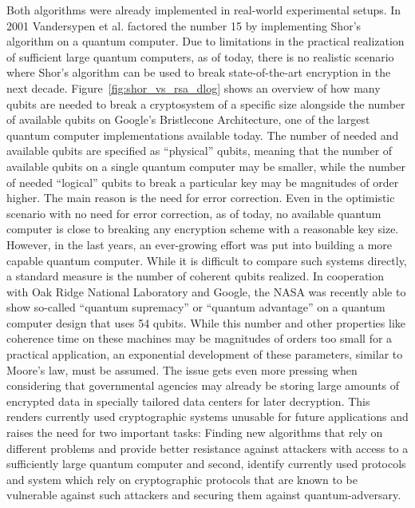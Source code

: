 Both algorithms were already implemented in real-world experimental setups. In 2001 Vandersypen et al. factored the number 15 by implementing Shor’s algorithm on a quantum computer\cite{vandersypen2001experimental}. Due to limitations in the practical realization of sufficient large quantum computers, as of today, there is no realistic scenario where Shor's algorithm can be used to break state-of-the-art encryption in the next decade. Figure~\ref{fig:shor_vs_rsa_dlog} shows an overview of how many qubits are needed to break a cryptosystem of a specific size alongside the number of available qubits on Google's Bristlecone Architecture, one of the largest quantum computer implementations available today. The number of needed and available qubits are specified as ``physical'' qubits, meaning that the number of available qubits on a single quantum computer may be smaller, while the number of needed ``logical'' qubits to break a particular key may be magnitudes of order higher. The main reason is the need for error correction. Even in the optimistic scenario with no need for error correction, as of today, no available quantum computer is close to breaking any encryption scheme with a reasonable key size. However, in the last years, an ever-growing effort was put into building a more capable quantum computer. While it is difficult to compare such systems directly, a standard measure is the number of coherent qubits realized. In cooperation with Oak Ridge National Laboratory and Google, the \ac{NASA} was recently able to show so-called ``quantum supremacy'' or ``quantum advantage'' on a quantum computer design that uses 54 qubits\cite{arute2019quantum}. While this number and other properties like coherence time on these machines may be magnitudes of orders too small for a practical application, an exponential development of these parameters, similar to Moore's law, must be assumed. The issue gets even more pressing when considering that governmental agencies may already be storing large amounts of encrypted data in specially tailored data centers for later decryption. This renders currently used cryptographic systems unusable for future applications and raises the need for two important tasks: Finding new algorithms that rely on different problems and provide better resistance against attackers with access to a sufficiently large quantum computer and second, identify currently used protocols and system which rely on cryptographic protocols that are known to be vulnerable against such attackers and securing them against quantum-adversary.

